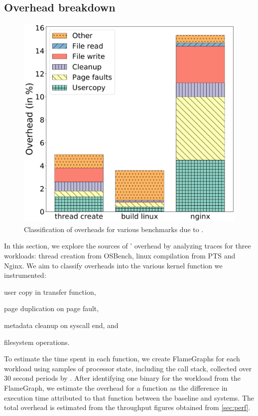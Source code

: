 \documentclass[letterpaper,twocolumn,10pt]{article}
\begin{document}
\subsection{Overhead breakdown}

\begin{figure}
  \centering
  \includegraphics[width=\linewidth]{img/overhead.pdf}
  \caption{Classification of overheads for various benchmarks due to \midas.}
  \label{fig:overhead_class}
\end{figure}

In this section, we explore the sources of \midas' overhead by analyzing
 traces for three workloads: thread creation from OSBench, linux
compilation from PTS and Nginx.
We aim to classify overheads into the various kernel function we instrumented:
\begin{inparaenum}
\item user copy in transfer function,
\item page duplication on page fault,
\item metadata cleanup on syscall end, and
\item filesystem operations.
\end{inparaenum}

To estimate the time spent in each function, we create FlameGraphs for
each workload\cite{GreggFlameGraph} using samples of processor state, including
the call stack, collected over 30 second periods by .
After identifying one binary for the workload from the FlameGraph, we estimate
the overhead for a function as the difference in execution time attributed to
that function between the baseline and \midas systems.
The total overhead is estimated from the throughput figures obtained from
\autoref{sec:perf}.
\end{document}

